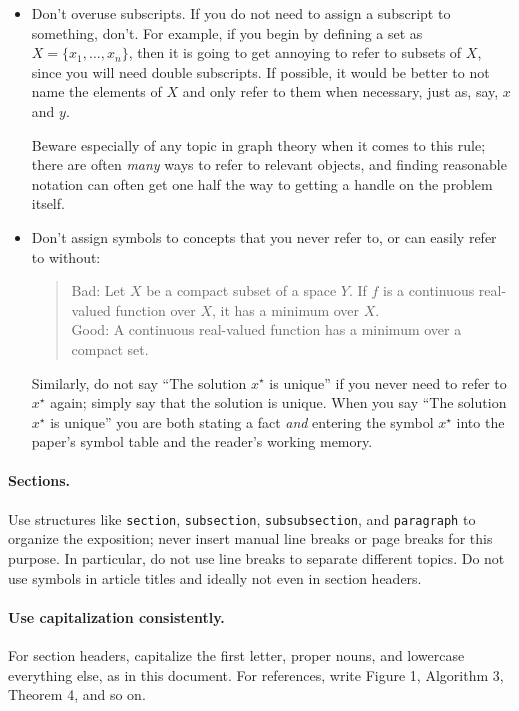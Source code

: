 \documentclass[12pt]{article}
\begin{document}
\begin{itemize}
\item Don't overuse subscripts. If you do not need to assign a subscript
to something, don't. For example, if you begin by defining a set as
$X = \{x_1, \dots, x_n\}$, then it is going to get annoying to refer to subsets
of $X$, since you will need double subscripts. If possible, it would be better
to not name the elements of $X$ and only refer to them when necessary, just
as, say, $x$ and $y$. 

Beware especially of any topic in graph theory when it comes to this rule;
there are often \emph{many} ways to refer to relevant objects, and finding
reasonable notation can often get one half the way to getting a handle on the
problem itself.

\item Don't assign symbols to concepts that you never refer to, or can easily
refer to without:
\begin{quote}
Bad: Let $X$ be a compact subset of a space $Y$. If $f$ is a continuous
real-valued function over $X$, it has a minimum over $X$. \\
Good: A continuous real-valued function has a minimum over a compact set.
\end{quote}
Similarly, do not say ``The solution $x^\star$ is unique'' if you never need
to refer to $x^\star$ again; simply say that the solution is unique.
When you say ``The solution $x^\star$ is unique'' you are both stating a fact
\emph{and} entering the symbol $x^\star$ into the paper's symbol table and
the reader's working memory.
\end{itemize}

\paragraph{Sections.}
Use structures like \texttt{section}, \texttt{subsection},
\texttt{subsubsection}, and \texttt{paragraph} to organize the exposition;
never insert manual line breaks or page breaks for this purpose. In particular,
do not use line breaks to separate different topics. Do not use symbols in
article titles and ideally not even in section headers.

\paragraph{Use capitalization consistently.}
For section headers, capitalize the first letter, proper nouns, and lowercase
everything else, as in this document.  For references, write Figure 1, Algorithm 3,
Theorem 4, and so on.
\end{document}

